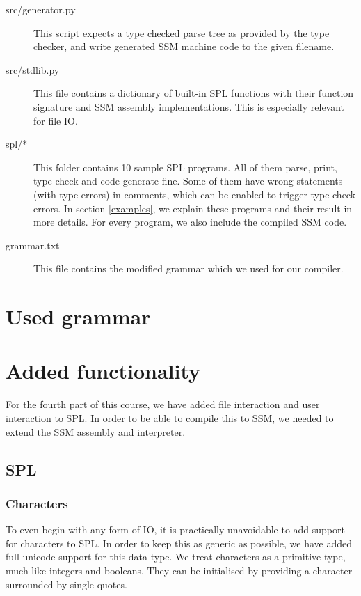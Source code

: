 \documentclass[a4paper]{article}
\begin{document}
\begin{description}
        \item[src/generator.py] This script expects a type checked parse tree as provided by the type checker, and write generated SSM machine code to the given filename. 
  \item[src/stdlib.py] This file contains a dictionary of built-in SPL functions with their function signature and SSM assembly implementations. This is especially relevant for file IO. 
        \item[spl/*] This folder contains 10 sample SPL programs. All of them parse, print, type check and code generate fine. Some of them have wrong statements (with type errors) in comments, which can be enabled to trigger type check errors. In section \ref{examples}, we explain these programs and their result in more details. For every program, we also include the compiled SSM code. 
        \item[grammar.txt] This file contains the modified grammar which we used for our compiler.
\end{description}

\newpage
\section{Used grammar}


\newpage
\section{Added functionality}
\label{part4}
For the fourth part of this course, we have added file interaction and user interaction to SPL. In order to be able to compile this to SSM, we needed to extend the SSM assembly and interpreter.

\subsection{SPL}

\subsubsection{Characters}

To even begin with any form of IO, it is practically unavoidable to add support for characters to SPL. In order to keep this as generic as possible, we have added full unicode support for this data type. We treat characters as a primitive type, much like integers and booleans. They can be initialised by providing a character surrounded by single quotes.
\end{document}
